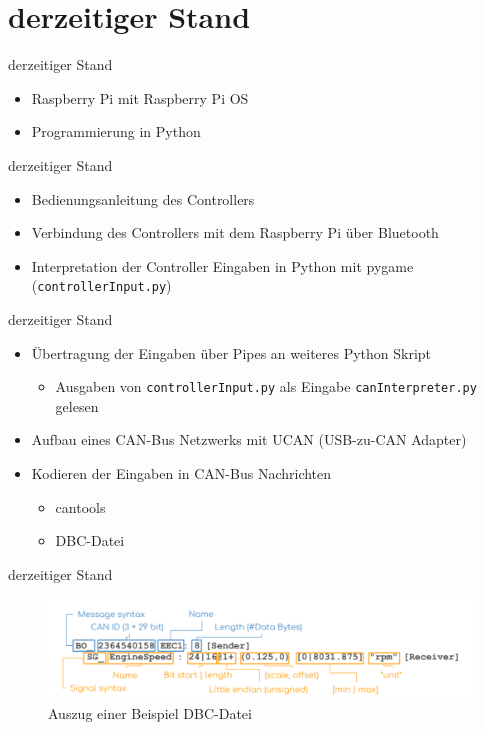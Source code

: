 \documentclass[usenames, dvipsnames, aspectratio=75]{beamer}
\begin{document}
\section{derzeitiger Stand}

\begin{frame}{derzeitiger Stand}
    \begin{itemize}
        \item Raspberry Pi mit Raspberry Pi OS
        \item Programmierung in Python
    \end{itemize}
    
\end{frame}

\begin{frame}{derzeitiger Stand}
    \begin{itemize}
        \item Bedienungsanleitung des Controllers
        \item Verbindung des Controllers mit dem Raspberry Pi über Bluetooth
        \item Interpretation der Controller Eingaben in Python mit pygame (\texttt{controllerInput.py})
    \end{itemize}
\end{frame}

\begin{frame}{derzeitiger Stand}
    \begin{itemize}
        \item Übertragung der Eingaben über Pipes an weiteres Python Skript \begin{itemize}
            \item Ausgaben von \texttt{controllerInput.py} als Eingabe \texttt{canInterpreter.py} gelesen
        \end{itemize}
        \item Aufbau eines CAN-Bus Netzwerks mit UCAN (USB-zu-CAN Adapter)
        \item Kodieren der Eingaben in CAN-Bus Nachrichten \begin{itemize}
            \item cantools
            \item DBC-Datei
        \end{itemize}
    \end{itemize}   
\end{frame}

\begin{frame}{derzeitiger Stand}
    \begin{figure}
        \centering
        \includegraphics[width=1\linewidth]{assets/CAN-DBC-File-Format-Explained-Intro-Basics_2.png}
        \caption{Auszug einer Beispiel DBC-Datei}
    \end{figure}
\end{frame}
\end{document}
